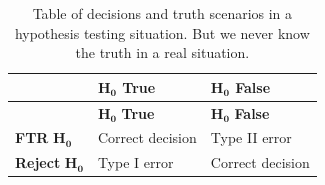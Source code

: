 \documentclass[]{book}
\theoremstyle{definition}
\theoremstyle{definition}
\theoremstyle{remark}
\begin{document}
\begin{longtable}[]{@{}lll@{}}
\caption{\label{tab:Table2-3} Table of decisions and truth scenarios in a hypothesis
testing situation. But we never know the truth in a real situation.}\tabularnewline
\toprule
\begin{minipage}[b]{0.30\columnwidth}\raggedright\strut
~\strut
\end{minipage} & \begin{minipage}[b]{0.30\columnwidth}\raggedright\strut
\(\mathbf{H_0}\) \textbf{True}\strut
\end{minipage} & \begin{minipage}[b]{0.30\columnwidth}\raggedright\strut
\(\mathbf{H_0}\) \textbf{False}\strut
\end{minipage}\tabularnewline
\midrule
\endfirsthead
\toprule
\begin{minipage}[b]{0.30\columnwidth}\raggedright\strut
~\strut
\end{minipage} & \begin{minipage}[b]{0.30\columnwidth}\raggedright\strut
\(\mathbf{H_0}\) \textbf{True}\strut
\end{minipage} & \begin{minipage}[b]{0.30\columnwidth}\raggedright\strut
\(\mathbf{H_0}\) \textbf{False}\strut
\end{minipage}\tabularnewline
\midrule
\endhead
\begin{minipage}[t]{0.30\columnwidth}\raggedright\strut
\textbf{FTR} \(\mathbf{H_0}\)\strut
\end{minipage} & \begin{minipage}[t]{0.30\columnwidth}\raggedright\strut
Correct decision\strut
\end{minipage} & \begin{minipage}[t]{0.30\columnwidth}\raggedright\strut
Type II error\strut
\end{minipage}\tabularnewline
\begin{minipage}[t]{0.30\columnwidth}\raggedright\strut
\textbf{Reject} \(\mathbf{H_0}\)\strut
\end{minipage} & \begin{minipage}[t]{0.30\columnwidth}\raggedright\strut
Type I error\strut
\end{minipage} & \begin{minipage}[t]{0.30\columnwidth}\raggedright\strut
Correct decision\strut
\end{minipage}\tabularnewline
\bottomrule
\end{longtable}
\end{document}

